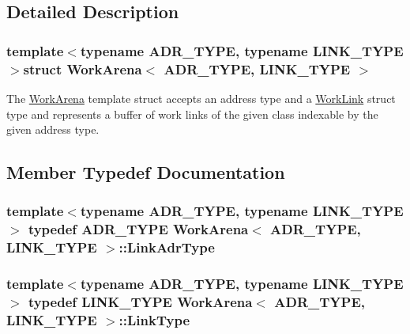 \subsection{Detailed Description}
\subsubsection*{template$<$typename A\-D\-R\-\_\-\-T\-Y\-P\-E, typename L\-I\-N\-K\-\_\-\-T\-Y\-P\-E$>$struct Work\-Arena$<$ A\-D\-R\-\_\-\-T\-Y\-P\-E, L\-I\-N\-K\-\_\-\-T\-Y\-P\-E $>$}

The {\ttfamily \hyperlink{structWorkArena}{Work\-Arena}} template struct accepts an address type and a {\ttfamily \hyperlink{structWorkLink}{Work\-Link}} struct type and represents a buffer of work links of the given class indexable by the given address type. 

\subsection{Member Typedef Documentation}
\hypertarget{structWorkArena_a1ad8a6c99cd108b5bb80df40d468637b}{
\subsubsection[{Link\-Adr\-Type}]{\setlength{\rightskip}{0pt plus 5cm}template$<$typename A\-D\-R\-\_\-\-T\-Y\-P\-E, typename L\-I\-N\-K\-\_\-\-T\-Y\-P\-E$>$ typedef A\-D\-R\-\_\-\-T\-Y\-P\-E {\bf Work\-Arena}$<$ A\-D\-R\-\_\-\-T\-Y\-P\-E, L\-I\-N\-K\-\_\-\-T\-Y\-P\-E $>$\-::{\bf Link\-Adr\-Type}}}\label{structWorkArena_a1ad8a6c99cd108b5bb80df40d468637b}
\hypertarget{structWorkArena_a2bf1c203f8a046339cd73be8b3136c28}{
\subsubsection[{Link\-Type}]{\setlength{\rightskip}{0pt plus 5cm}template$<$typename A\-D\-R\-\_\-\-T\-Y\-P\-E, typename L\-I\-N\-K\-\_\-\-T\-Y\-P\-E$>$ typedef L\-I\-N\-K\-\_\-\-T\-Y\-P\-E {\bf Work\-Arena}$<$ A\-D\-R\-\_\-\-T\-Y\-P\-E, L\-I\-N\-K\-\_\-\-T\-Y\-P\-E $>$\-::{\bf Link\-Type}}}\label{structWorkArena_a2bf1c203f8a046339cd73be8b3136c28}


